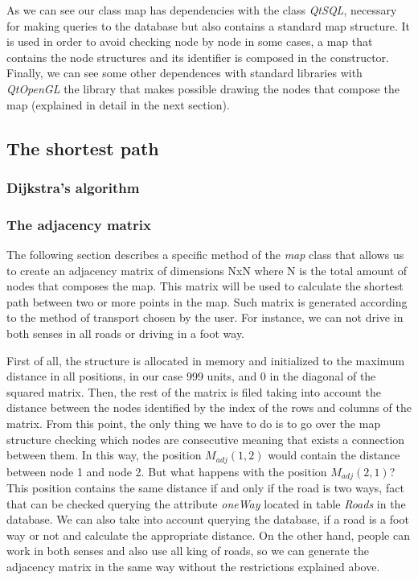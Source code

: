 \documentclass{article}
\begin{document}
As we can see our class map has dependencies with the class \textit{QtSQL}, necessary for making queries to the database but also contains a standard map structure. It is used in order to avoid checking node by node in some cases, a map that contains the node structures and its identifier is composed in the constructor. Finally, we can see some other dependences with standard libraries with \textit{QtOpenGL} the library that makes possible drawing the nodes that compose the map (explained in detail in the next section).

\subsection{The shortest path}


\subsubsection{Dijkstra's algorithm}

\subsubsection{The adjacency matrix}
The following section describes a specific method of the \textit{map} class that allows us to create an adjacency matrix of dimensions NxN where N is the total amount of nodes that composes the map. This matrix will be used to calculate the shortest path between two or more points in the map. Such matrix is generated according to the method of transport chosen by the user. For instance, we can not drive in both senses in all roads or driving in a foot way.

First of all, the structure is allocated in memory and initialized to the maximum distance in all positions, in our case 999 units, and 0 in the diagonal of the squared matrix. Then, the rest of the matrix is filed taking into account the distance between the nodes identified by the index of the rows and columns of the matrix. From this point, the only thing we have to do is to go over the map structure checking which nodes are consecutive meaning that exists a connection between them. In this way, the position $M_{adj}(1,2)$ would contain the distance between node 1 and node 2. But what happens with the position $M_{adj}(2,1)$? This position contains the same distance if and only if the road is two ways, fact that can be checked querying the attribute \textit{oneWay} located in table \textit{Roads} in the database. 
We can also take into account querying the database, if a road is a foot way or not and calculate the appropriate distance.
On the other hand, people can work in both senses and also use all king of roads, so we can generate the adjacency matrix in the same way without the restrictions explained above.
\end{document}
